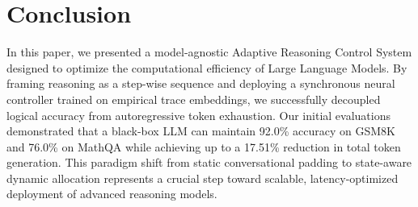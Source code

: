 \documentclass[11pt]{article}
\begin{document}
\section{Conclusion}
In this paper, we presented a model-agnostic Adaptive Reasoning Control System designed to optimize the computational efficiency of Large Language Models. By framing reasoning as a step-wise sequence and deploying a synchronous neural controller trained on empirical trace embeddings, we successfully decoupled logical accuracy from autoregressive token exhaustion. Our initial evaluations demonstrated that a black-box LLM can maintain 92.0\% accuracy on GSM8K and 76.0\% on MathQA while achieving up to a 17.51\% reduction in total token generation. This paradigm shift from static conversational padding to state-aware dynamic allocation represents a crucial step toward scalable, latency-optimized deployment of advanced reasoning models.



\end{document}
